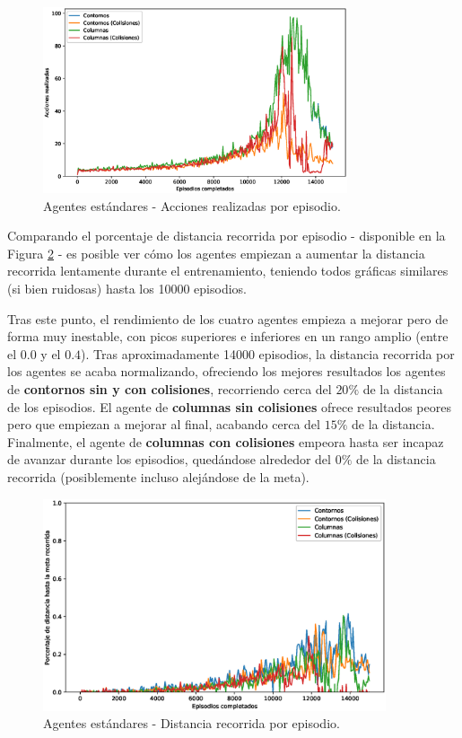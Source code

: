 \begin{figure}[H]
    \centering
    \includegraphics[width=0.8\textwidth]{imagenes/cap6/standard/smoothed_actions.eps}
    \caption{Agentes estándares - Acciones realizadas por episodio.}
    \label{fig:chap6-standard-actions}
\end{figure}

Comparando el porcentaje de distancia recorrida por episodio - disponible en la Figura \ref{fig:chap6-standard-distances} - es posible ver cómo los agentes empiezan a aumentar la distancia recorrida lentamente durante el entrenamiento, teniendo todos gráficas similares (si bien ruidosas) hasta los 10000 episodios.

Tras este punto, el rendimiento de los cuatro agentes empieza a mejorar pero de forma muy inestable, con picos superiores e inferiores en un rango amplio (entre el $0.0$ y el $0.4$). Tras aproximadamente 14000 episodios, la distancia recorrida por los agentes se acaba normalizando, ofreciendo los mejores resultados los agentes de \textbf{contornos sin y con colisiones}, recorriendo cerca del $20\%$ de la distancia de los episodios. El agente de \textbf{columnas sin colisiones} ofrece resultados peores pero que empiezan a mejorar al final, acabando cerca del $15\%$ de la distancia. Finalmente, el agente de \textbf{columnas con colisiones} empeora hasta ser incapaz de avanzar durante los episodios, quedándose alrededor del $0\%$ de la distancia recorrida (posiblemente incluso alejándose de la meta).

\begin{figure}[h]
    \centering
    \includegraphics[width=0.9\textwidth]{imagenes/cap6/standard/smoothed_distances.eps}
    \caption{Agentes estándares - Distancia recorrida por episodio.}
    \label{fig:chap6-standard-distances}
\end{figure}

